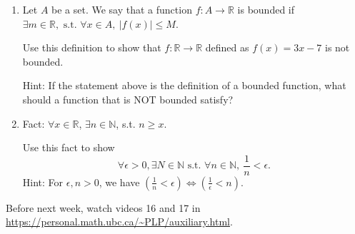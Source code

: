 \documentclass[12pt]{article}
\newcommand{\st}{\text{ s.t. }}
\begin{document}
\begin{enumerate}
\item Let $A$ be a set. We say that a function $f: A\to \mathbb R$ is bounded if $\exists m\in\mathbb R, \st \forall x\in A,\  |f(x)|\leq M$.

Use this definition to show that $f:\mathbb R\to \mathbb R$ defined as $f(x)=3x-7$ is not bounded.

Hint: If the statement above is the definition of a bounded function, what should a function that is NOT bounded satisfy?

\item Fact: $\forall x\in\mathbb R$, $\exists n\in\mathbb N$, s.t. $n\geq x$.

Use this fact to show
\[\forall \epsilon>0, \exists N\in\mathbb N \st \forall n\in\mathbb N,\ \dfrac{1}{n}<\epsilon.\] 
Hint: For $\epsilon, n>0$, we have $(\frac 1n<\epsilon) \iff (\frac{1}{\epsilon}<n)$.

\end{enumerate}

Before next week, watch videos 16 and 17 in \url{https://personal.math.ubc.ca/~PLP/auxiliary.html}.
\end{document}
